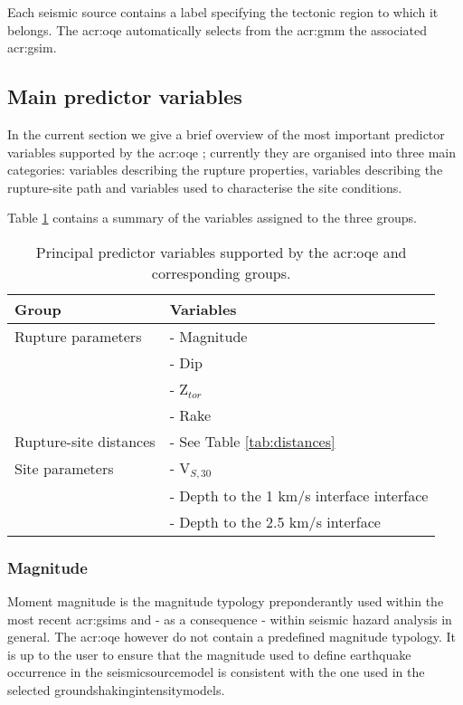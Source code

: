 Each seismic source contains a label specifying 
the tectonic region to which it belongs. The \gls{acr:oqe} automatically 
selects from the \gls{acr:gmm} the associated \gls{acr:gsim}.

%
\subsection{Main predictor variables}
In the current section we give a brief overview of the most 
important predictor variables supported by the \gls{acr:oqe}
\parencite[for general a summary, see][]{akkar2013r}; 
currently they are organised into three main categories: variables 
describing the rupture properties, variables describing the rupture\--site 
path and variables used to characterise the site conditions. 

Table \ref{tab:parameters} contains a summary of the variables
assigned to the three groups.
\begin{table}[!h]
\centering
\caption{Principal predictor variables supported by the \gls{acr:oqe} and 
    corresponding groups.}
\begin{tabular}{|p{5cm}p{8cm}|}
\hline
\rowcolor{anti-flashwhite}
\bf{Group} & \bf{Variables} \\
\hline 
Rupture parameters & - Magnitude\\
                   & - Dip \\ 
                   & - Z$_{tor}$ \\ 
                   & - Rake \\ \hline
Rupture-site distances & - See Table \ref{tab:distances} \\ \hline
Site parameters & - V$_{S,30}$ \\
                & - Depth to the 1 km/s interface interface \\
                & - Depth to the 2.5 km/s interface \\ 
\hline
\end{tabular}
\label{tab:parameters}
\end{table}
%
\subsubsection{Magnitude}
Moment magnitude \parencite{hanks1979} is the magnitude typology 
preponderantly used within the most recent \glspl{acr:gsim} and - as a 
consequence - within seismic hazard analysis in general. 
%
The \gls{acr:oqe} however do not contain a predefined magnitude typology.
It is up to the user to ensure that the magnitude used to define earthquake 
occurrence in the \gls{seismicsourcemodel} is consistent with the one used 
in the selected \glspl{groundshakingintensitymodel}.


